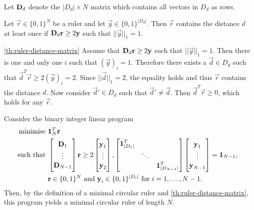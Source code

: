 \documentclass[a4paper, openany, oneside]{memoir}
\begin{document}
Let $\boldsymbol{\mathbf{D}}_d$ denote the $|D_d| \times N$ matrix which contains all vectors in $D_d$ as rows.

\begin{blockTheorem} \label{th:ruler-distance-matrix}\nolinebreak
    Let $\vec{r} \in \{0,1\}^N$ be a ruler and let $\vec{y} \in \{0,1\}^{|D_d|}$. Then $\vec{r}$ contains the distance $d$ at least once if $\boldsymbol{\mathbf{D}}_d \boldsymbol{\mathbf{r}} \ge 2\boldsymbol{\mathbf{y}}$ such that $||\vec{y}||_1 = 1$.
\end{blockTheorem}

\begin{blockProofTheorem}{\ref{th:ruler-distance-matrix}}
    Assume that $\boldsymbol{\mathbf{D}}_d \boldsymbol{\mathbf{r}} \ge 2 \boldsymbol{\mathbf{y}}$ such that $||\vec{y}||_1 = 1$. Then there is one and only one $i$ such that $(\vec{y})_i=1$. Therefore there exists a $\vec{d} \in D_d$ such that $\vec{d}^T \vec{r} \ge 2 (\vec{y})_i = 2$. Since $||\vec{d}||_1=2$, the equality holds and thus $\vec{r}$ contains the distance $d$. Now consider $\vec{d}' \in D_d$ such that $\vec{d}' \neq \vec{d}$. Then $\vec{d}^T \vec{r} \ge 0$, which holds for any $\vec{r}$.  
\end{blockProofTheorem}

Consider the binary integer linear program
\begin{align*}
    \text{minimise } &\boldsymbol{\mathbf{1}}_N^T \boldsymbol{\mathbf{r}} \\
    \text{such that } &
    \begin{bmatrix}
        \boldsymbol{\mathbf{D}}_1 \\
        \vdots \\
        \boldsymbol{\mathbf{D}}_{N-1}
    \end{bmatrix} \boldsymbol{\mathbf{r}} \ge 2 \begin{bmatrix}
        \boldsymbol{\mathbf{y}}_1 \\
        \vdots \\
        \boldsymbol{\mathbf{y}}_2
    \end{bmatrix}, \begin{bmatrix}
        \boldsymbol{\mathbf{1}}_{|D_1|}^T & & \\
        & \ddots & \\
        & & \boldsymbol{\mathbf{1}}_{|D_{N-1}|}^T
    \end{bmatrix}  \begin{bmatrix}
        \boldsymbol{\mathbf{y}}_1 \\
        \vdots \\
        \boldsymbol{\mathbf{y}}_{N-1}
    \end{bmatrix} = \boldsymbol{\mathbf{1}}_{N-1}, \\
    & \boldsymbol{\mathbf{r}} \in \{0,1\}^N \text{ and } \boldsymbol{\mathbf{y}}_i \in \{0,1\}^{|D_i|} \text{ for } i = 1,\ldots,N-1.
\end{align*}
Then, by the definition of a minimal circular ruler and \cref{th:ruler-distance-matrix}, this program yields a minimal circular ruler of length $N$.
\end{document}
